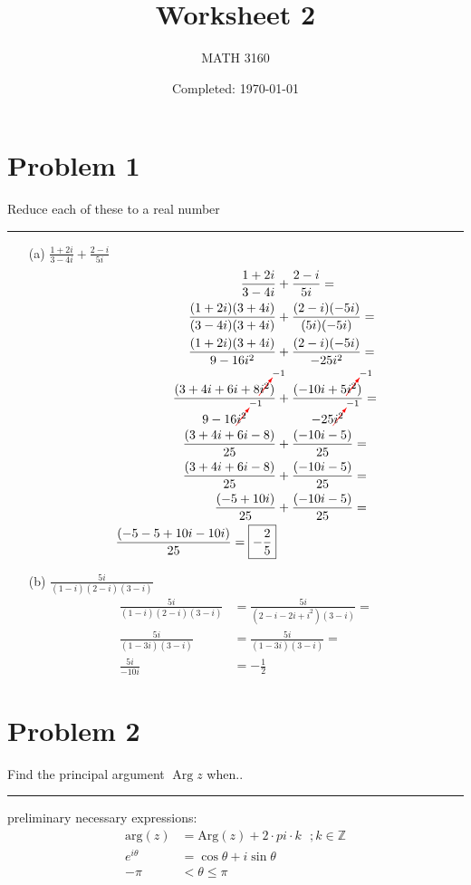 \documentclass{article}
\title{Worksheet 2}
\author{
  MATH 3160\\
  \myauthor
}
\date{Completed: \today} %
\newcommand{\canceling}[2]{\textcolor{red}{\cancelto{\textcolor{black}{#1}}{\textcolor{black}{#2}}}}
\DeclareMathOperator{\Arg}{Arg}
\begin{document}
\maketitle


\section*{Problem 1}
Reduce each of these to a real number

\hrule
\begin{enumerate}
\item[(a)] $ \frac{1+2i}{3-4i} + \frac{2-i}{5i}$
  \begin{align*}
    \frac{1+2i}{3-4i} &+ \frac{2-i}{5i} = \\
    \frac{(1+2i)(3+4i)}{(3-4i)(3+4i)} &+ \frac{(2-i)(-5i)}{(5i)(-5i)} = \\
    \frac{(1+2i)(3+4i)}{9-16i^2} &+ \frac{(2-i)(-5i)}{-25i^2} = \\
    \frac{(3+4i+6i+8\canceling{-1}{i^2})}{9-16\canceling{-1}{i^2}} &+ \frac{(-10i+5\canceling{-1}{i^2})}{-25\canceling{-1}{i^2}} = \\
    \frac{(3+4i+6i-8)}{25} &+ \frac{(-10i-5)}{25} = \\
    \frac{(3+4i+6i-8)}{25} &+ \frac{(-10i-5)}{25} = \\
    \frac{(-5+10i)}{25} &+ \frac{(-10i-5)}{25} = \\
    \frac{(-5-5+10i -10i)}{25} = \boxed{-\frac{2}{5}}\\
  \end{align*}
\item[(b)] $ \frac{5i}{(1-i)(2-i)(3-i)}$
  \begin{align*}
    \frac{5i}{(1-i)(2-i)(3-i)} &= \frac{5i}{(2-i-2i+i^2)(3-i)} = \\
    \frac{5i}{(1-3i)(3-i)} &= \frac{5i}{(1-3i)(3-i)} =\\
    \frac{5i}{-10i} &= \boxed{-\frac{1}{2}}
  \end{align*}
\end{enumerate}

\newpage
\section*{Problem 2}
Find the principal argument $\Arg z$ when..
\hrule
preliminary necessary expressions:
  \begin{align*}
    \text{arg}(z) &= \text{Arg}(z) + 2\cdot pi\cdot k\ \ \ ;k\in \mathbb{Z} \\
    e^{i\theta} &= \cos\theta + i\sin{\theta}\\
    -\pi & < \theta \le \pi 
  \end{align*}
\end{document}
